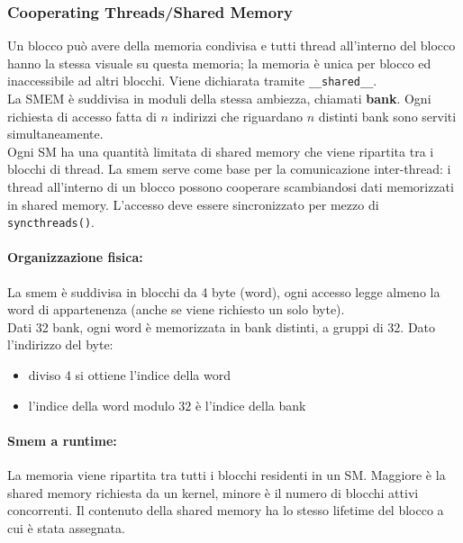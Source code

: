 \newpage

\subsubsection{Cooperating Threads/Shared Memory}
Un blocco può avere della memoria condivisa e tutti thread all'interno del blocco hanno la stessa visuale su questa memoria; la memoria è unica per blocco ed inaccessibile ad altri blocchi. Viene dichiarata tramite \texttt{\_\_shared\_\_}.\\

La SMEM è suddivisa in moduli della stessa ambiezza, chiamati \textbf{bank}. Ogni richiesta di accesso fatta di $n$ indirizzi che riguardano $n$ distinti bank sono serviti simultaneamente.\\

Ogni SM ha una quantità limitata di shared memory che viene ripartita tra i blocchi di thread. La smem serve come base per la comunicazione inter-thread: i thread all'interno di un blocco possono cooperare scambiandosi dati memorizzati in shared memory. L'accesso deve essere sincronizzato per mezzo di \texttt{syncthreads()}.\\

\paragraph{Organizzazione fisica:} La smem è suddivisa in blocchi da 4 byte (word), ogni accesso legge almeno la word di appartenenza (anche se viene richiesto un solo byte).\\

Dati 32 bank, ogni word è memorizzata in bank distinti, a gruppi di 32. Dato l'indirizzo del byte: 
\begin{itemize}
	\item diviso 4 si ottiene l'indice della word
	\item l'indice della word modulo $32$ è l'indice della bank
\end{itemize}

\paragraph{Smem a runtime:} La memoria viene ripartita tra tutti i blocchi residenti in un SM. Maggiore è la shared memory richiesta da un kernel, minore è il numero di blocchi attivi concorrenti. Il contenuto della shared memory ha lo stesso lifetime del blocco a cui è stata assegnata.\\

